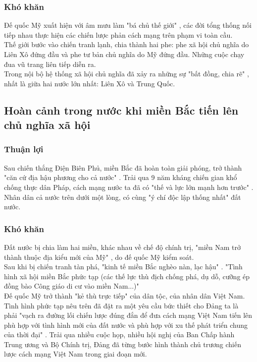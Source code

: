 \subsubsection{Khó khăn}
Đế quốc Mỹ xuất hiện với âm mưu làm "bá chủ thế giới" \supercite{giaotrinh}, các đời tổng thống nối tiếp nhau thực hiện các chiến lược phản cách mạng trên phạm vi toàn cầu.\\
Thế giới bước vào chiến tranh lạnh, chia thành hai phe: phe xã hội chủ nghĩa do Liên Xô đứng đầu và phe tư bản chủ nghĩa do Mỹ đứng đầu. Những cuộc chạy đua vũ trang liên tiếp diễn ra.\\
Trong nội bộ hệ thống xã hội chủ nghĩa đã xảy ra những sự "bất đồng, chia rẽ" \supercite{giaotrinh}, nhất là giữa hai nước lớn nhất: Liên Xô và Trung Quốc.

\subsection{Hoàn cảnh trong nước khi miền Bắc tiến lên chủ nghĩa xã hội}
\subsubsection{Thuận lợi}
Sau chiến thắng Điện Biên Phủ, miền Bắc đã hoàn toàn giải phóng, trở thành "căn cứ địa hậu phương cho cả nước" \supercite{giaotrinh}. Trải qua 9 năm kháng chiến gian khổ chống thực dân Pháp, cách mạng nước ta đã có "thế và lực lớn mạnh hơn trước" \supercite{giaotrinh}.\\
Nhân dân cả nước trên dưới một lòng, có cùng "ý chí độc lập thống nhất" \supercite{giaotrinh} đất nước.
\subsubsection{Khó khăn}
Đất nước bị chia làm hai miền, khác nhau về chế độ chính trị, "miền Nam trở thành thuộc địa kiểu mới của Mỹ" \supercite{gtduongloi}, do đế quốc Mỹ kiểm soát.\\
Sau khi bị chiến tranh tàn phá, "kinh tế miền Bắc nghèo nàn, lạc hậu" \supercite{giaotrinh}. "Tình hình xã hội miền Bắc phức tạp (các thế lực thù địch chống phá, dụ dỗ, cưỡng ép đồng bào Công giáo di cư vào miền Nam...)" \supercite{hvct}\\
Đế quốc Mỹ trở thành "kẻ thù trực tiếp" \supercite{giaotrinh} của dân tộc, của nhân dân Việt Nam.\\
Tình hình phức tạp nêu trên đã đặt ra một yêu cầu bức thiết cho Đảng ta là phải "vạch ra đường lối chiến lược đúng đắn để đưa cách mạng Việt Nam tiến lên phù hợp với tình hình mới của đất nước và phù hợp với xu thế phát triển chung của thời đại" \supercite{giaotrinh}. Trải qua nhiều cuộc họp, nhiều hội nghị của Ban Chấp hành Trung ương và Bộ Chính trị, Đảng đã từng bước hình thành chủ trương chiến lược cách mạng Việt Nam trong giai đoạn mới.

